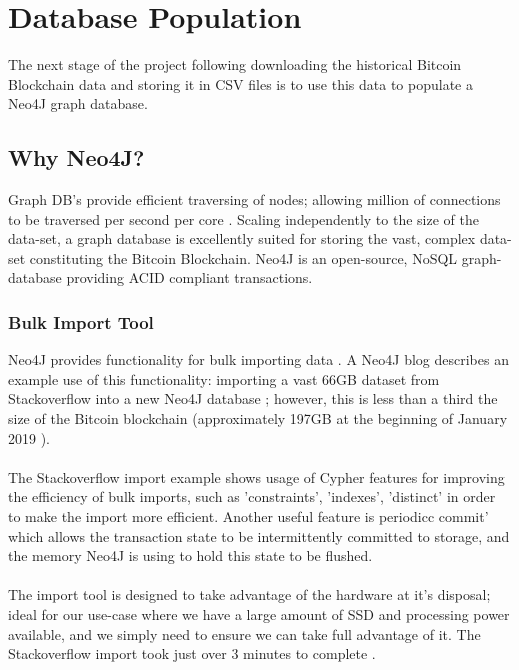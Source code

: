 \section{Database Population}\label{section-blockchain-import}
The next stage of the project following downloading the historical Bitcoin Blockchain data and storing it in CSV files is to use this data to populate a Neo4J graph database. 

\subsection{Why Neo4J?}
Graph DB's provide efficient traversing of nodes; allowing million of connections to be traversed per second per core \cite{RefWorks:doc:5c98f0c6e4b00cbb4da393d8}. Scaling independently to the size of the data-set, a graph database is excellently suited for storing the vast, complex data-set constituting the Bitcoin Blockchain. Neo4J is an open-source, NoSQL graph-database providing ACID compliant transactions.

\subsubsection{Bulk Import Tool}
Neo4J provides functionality for bulk importing data \cite{RefWorks:doc:5c6ab610e4b02c4a19ae3ed1}. A Neo4J blog describes an example use of this functionality: importing a  vast 66GB dataset from Stackoverflow into a new Neo4J database \cite{RefWorks:doc:5c6ab2bae4b08c9b85da964f}; however, this is less than a third the size of the Bitcoin blockchain (approximately 197GB at the beginning of January 2019 \cite{RefWorks:doc:5c6ab1a3e4b05e3aaec0ffc8}).
\\\\ 
The Stackoverflow import example shows usage of Cypher features for improving the efficiency of bulk imports, such as 'constraints', 'indexes', 'distinct'  in order to make the import more efficient. Another useful feature is periodicc commit' which allows the transaction state to be intermittently committed to storage, and the memory Neo4J is using to hold this state to be flushed. 
\\\\
The import tool is designed to take advantage of the hardware at it's disposal; ideal for our use-case where we have a large amount of SSD and processing power available, and we simply need to ensure we can take full advantage of it. The Stackoverflow import took just over 3 minutes to complete \cite{RefWorks:doc:5c6ab2bae4b08c9b85da964f}. 

